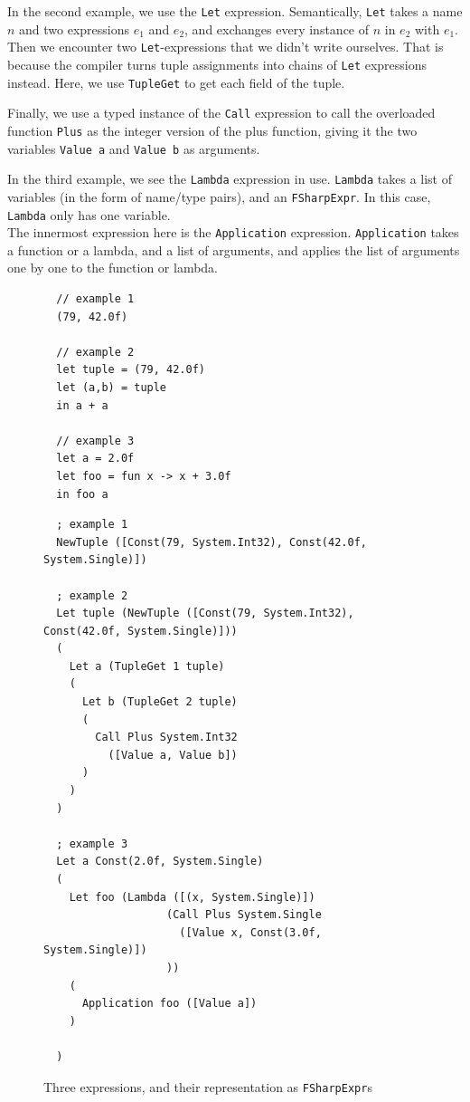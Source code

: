 In the second example, we use the \texttt{Let} expression. Semantically, \texttt{Let} takes a
name $n$ and two expressions $e_1$ and $e_2$, and exchanges every instance of
$n$ in $e_2$ with $e_1$.
Then we encounter two \texttt{Let}-expressions that we didn't write ourselves.
That is because the \fsharp{} compiler turns tuple assignments into chains of
\texttt{Let} expressions instead. Here, we use \texttt{TupleGet} to get each
field of the tuple.

Finally, we use a typed instance of the \texttt{Call} expression to call the
overloaded function \texttt{Plus} as the integer version of the plus function,
giving it the two variables \texttt{Value a} and \texttt{Value b} as arguments.

In the third example, we see the \texttt{Lambda} expression in use. \texttt{Lambda} takes
a list of variables (in the form of name/type pairs), and an \texttt{FSharpExpr}. In this case,
\texttt{Lambda} only has one variable.\\
The innermost expression here is the \texttt{Application} expression.
\texttt{Application} takes a function or a lambda, and a list of arguments, and
applies the list of arguments one by one to the function or lambda.

\begin{figure}[H]
  \centering
\begin{verbatim}
  // example 1
  (79, 42.0f)

  // example 2
  let tuple = (79, 42.0f)
  let (a,b) = tuple
  in a + a

  // example 3
  let a = 2.0f
  let foo = fun x -> x + 3.0f
  in foo a
\end{verbatim}

\begin{verbatim}
  ; example 1
  NewTuple ([Const(79, System.Int32), Const(42.0f, System.Single)])

  ; example 2
  Let tuple (NewTuple ([Const(79, System.Int32), Const(42.0f, System.Single)]))
  ( 
    Let a (TupleGet 1 tuple) 
    (
      Let b (TupleGet 2 tuple) 
      (
        Call Plus System.Int32 
          ([Value a, Value b])
      )       
    )
  )

  ; example 3
  Let a Const(2.0f, System.Single)
  (
    Let foo (Lambda ([(x, System.Single)]) 
                   (Call Plus System.Single 
                     ([Value x, Const(3.0f, System.Single)])
                   ))
    (
      Application foo ([Value a])
    )

  )
\end{verbatim}
  \caption{Three \fsharp{} expressions, and their representation as
    \texttt{FSharpExpr}s}
  \label{fig:fsharpexprs0}
\end{figure}

